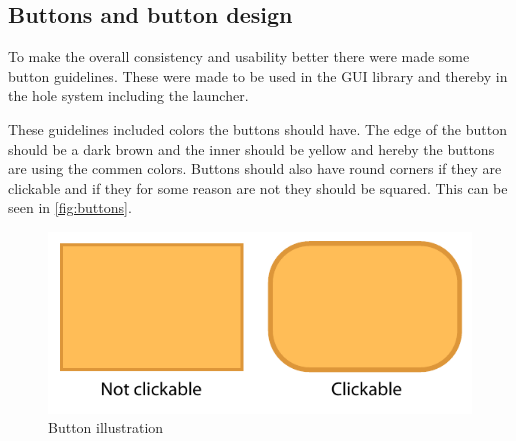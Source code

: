 \subsection{Buttons and button design}
\label{GUI:buttons}

To make the overall consistency and usability better there were made some button guidelines. These were made to be used in the \giraf[] GUI library and thereby in the hole \giraf[] system including the launcher.

These guidelines included colors the buttons should have. The edge of the button should be a dark brown and the inner should be yellow and hereby the buttons are using the commen \giraf[] colors. Buttons should also have round corners if they are clickable and if they for some reason are not they should be squared. This can be seen in \autoref{fig:buttons}.

\begin{figure}[h!]
	\centering
	\includegraphics[scale=0.6]{gfx/buttons.pdf}
	\caption{Button illustration}
	\label{fig:buttons}
\end{figure}



